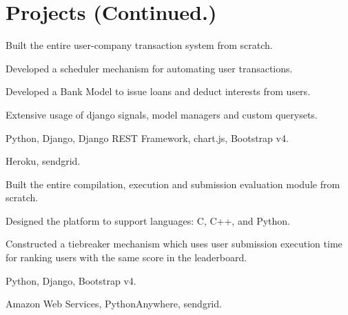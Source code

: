 \section{Projects \small{(Continued.)}}

 \vspace{0.1in}
\begin{tightemize}
\item Built the entire user-company transaction system from scratch.
\item Developed a scheduler mechanism for automating user transactions.
\item Developed a Bank Model to issue loans and deduct interests from users.
\item Extensive usage of django signals, model managers and custom querysets.
\item {} Python, Django, Django REST Framework, chart.js, Bootstrap v4.
\item {} Heroku, sendgrid.
\end{tightemize}
\sectionsep

\begin{tightemize}
\item Built the entire compilation, execution and submission evaluation module from scratch.
\item Designed the platform to support languages: C, C++, and Python.
\item Constructed a tiebreaker mechanism which uses user submission execution time for ranking users with the same score in the leaderboard.
\item {} Python, Django, Bootstrap v4.
\item {} Amazon Web Services, PythonAnywhere, sendgrid.
\end{tightemize}
\sectionsep

